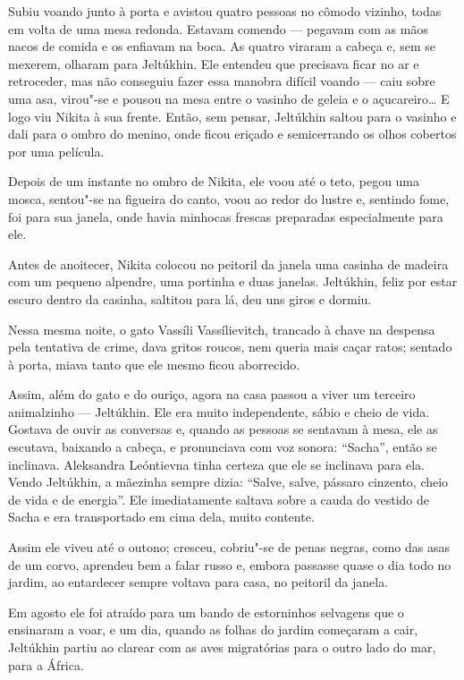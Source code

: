 Subiu voando junto à porta e avistou quatro pessoas no cômodo vizinho,
todas em volta de uma mesa redonda. Estavam comendo --- pegavam com as
mãos nacos de comida e os enfiavam na boca. As quatro viraram a cabeça
e, sem se mexerem, olharam para Jeltúkhin. Ele entendeu que precisava
ficar no ar e retroceder, mas não conseguiu fazer essa manobra difícil
voando --- caiu sobre uma asa, virou"-se e pousou na mesa entre o vasinho
de geleia e o açucareiro\ldots{} E logo viu Nikita à sua frente. Então, sem
pensar, Jeltúkhin saltou para o vasinho e dali para o ombro do menino,
onde ficou eriçado e semicerrando os olhos cobertos por uma
película.

Depois de um instante no ombro de Nikita, ele voou até o teto, pegou uma
mosca, sentou"-se na figueira do canto, voou ao redor do lustre e,
sentindo fome, foi para sua janela, onde havia minhocas frescas
preparadas especialmente para ele.

Antes de anoitecer, Nikita colocou no peitoril da janela uma casinha de
madeira com um pequeno alpendre, uma portinha e duas janelas. Jeltúkhin, feliz por estar escuro dentro da casinha, saltitou para lá, deu uns
giros e dormiu.

Nessa mesma noite, o gato Vassíli Vassílievitch, trancado à chave na
despensa pela tentativa de crime, dava gritos roucos, nem queria mais
caçar ratos; sentado à porta, miava tanto que ele mesmo ficou
aborrecido.

Assim, além do gato e do ouriço, agora na casa passou a viver um
terceiro animalzinho --- Jeltúkhin. Ele era muito independente, sábio e
cheio de vida. Gostava de ouvir as conversas e, quando as pessoas se
sentavam à mesa, ele as escutava, baixando a cabeça, e pronunciava com
voz sonora: ``Sacha'', então se inclinava. Aleksandra Leóntievna tinha
certeza que ele se inclinava para ela. Vendo Jeltúkhin, a
mãezinha sempre dizia: ``Salve, salve, pássaro cinzento, cheio de vida e
de energia''. Ele imediatamente saltava sobre a cauda do vestido de
Sacha e era transportado em cima dela, muito contente.

Assim ele viveu até o outono; cresceu, cobriu"-se de penas negras, como
das asas de um corvo, aprendeu bem a falar russo e, embora passasse
quase o dia todo no jardim, ao entardecer sempre voltava para casa, no
peitoril da janela.

Em agosto ele foi atraído para um bando de estorninhos selvagens que o
ensinaram a voar, e um dia, quando as folhas do jardim começaram a cair,
Jeltúkhin partiu ao clarear com as aves migratórias para o outro lado do
mar, para a África.


